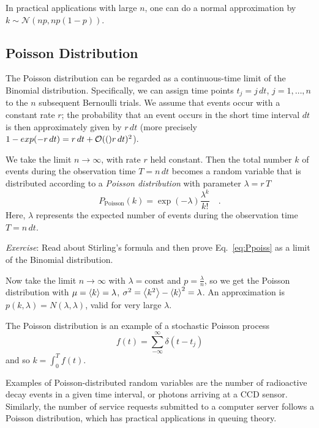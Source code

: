 \documentclass{notebook}
\newcommand{\Exercise}{\textit{Exercise}}
\begin{document}
In practical applications with large $n$, one can do a normal approximation by 
$k \sim \mathcal{N}(np, n p (1 - p))$. %


\subsection*{Poisson Distribution}
The Poisson distribution can be regarded as a continuous-time limit of the Binomial distribution.
Specifically, 
we can assign time points $t_j = j \, dt$, $j=1,\ldots,n$ to the $n$ subsequent Bernoulli trials.
We assume that events occur with a constant rate $r$; 
the probability that an event occurs in the short time interval $dt$ 
is then approximately given by $r\,dt$
(more precisely $1-exp(-r\,dt)=r\,dt+\mathcal{O}(()r\,dt)^2$).

We take the limit $n\rightarrow\infty$, with rate $r$ held constant.
Then the total number $k$ of events during the observation time $T=n\,dt$ 
becomes a random variable that is distributed according to a
\textit{Poisson distribution} with parameter $\lambda = r\,T$
\begin{equation}
\label{eq:Ppoiss}
P_\mathrm{Poisson}(k) = \exp(-\lambda) \frac{\lambda^k}{k!} \quad.
\end{equation}
Here, $\lambda$ represents the expected number of events during the observation time $T=n\,dt$.

\Exercise:
Read about Stirling's formula and then prove Eq.~\eqref{eq:Ppoiss} as a limit of the Binomial distribution.


Now take the limit $n \to \infty$ with $\lambda = \mathrm{const}$ and $p = \frac{\lambda}{n}$, so we get the Poisson distribution
%
%
with $\mu = \expval{k} = \lambda$, $\sigma^2 = \expval{k^2} - \expval{k}^2 = \lambda$. An approximation is $p(k,\lambda) = N(\lambda, \lambda)$, valid for very large $\lambda$.

\begin{remark}
	The Poisson distribution is an example of a stochastic Poisson process 
	\begin{equation}
	f(t) = \sum^{\infty}_{-\infty}{\delta(t - t_j)}
	\end{equation}
	and so $k = \int^T_0{f(t)} $.	
\end{remark}
Examples of Poisson-distributed random variables are 
the number of radioactive decay events in a given time interval, 
or photons arriving at a CCD sensor. 
Similarly, the number of service requests submitted to a computer server follows a Poisson distribution, 
which has practical applications in queuing theory.
\end{document}
